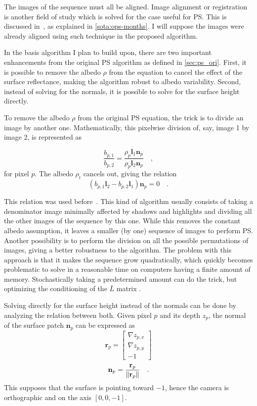The images of the sequence must all be aligned. Image alignment or registration is another field of study which is solved for the case useful for PS. This is discussed in~\cite{ackermann-cvpr-12}, as explained in \ref{sota:ops-months}. I will suppose the images were already aligned using such technique in the proposed algorithm.

In the basis algorithm I plan to build upon, there are two important enhancements from the original PS algorithm as defined in \ref{sec:ps_ori}. First, it is possible to remove the albedo $\rho$ from the equation to cancel the effect of the surface reflectance, making the algorithm robust to albedo variability. Second, instead of solving for the normals, it is possible to solve for the surface height directly. 

To remove the albedo $\rho$ from the original PS equation, the trick is to divide an image by another one. Mathematically, this pixelwise division of, say, image 1 by image 2, is represented as

\begin{equation}
\frac{b_{p,1}}{b_{p,2}} = \frac{\rho_p \mathbf{l}_1 \mathbf{n}_p}{\rho_p \mathbf{l}_2 \mathbf{n}_p} \quad,
\end{equation}
for pixel $p$. The albedo $\rho_t$ cancels out, giving the relation
\begin{equation}
\label{eq:ratio_images}
\left( b_{p,1} \mathbf{l}_2 - b_{p,2} \mathbf{l}_1 \right) \mathbf{n}_p = 0  \quad.
\end{equation}

This relation was used before~\cite{yu-iccp-13,wu-pami-06}. This kind of algorithm usually consists of taking a denominator image minimally affected by shadows and highlights and dividing all the other images of the sequence by this one. While this removes the constant albedo assumption, it leaves a smaller (by one) sequence of images to perform PS. Another possibility is to perform the division on all the possible permutations of images, giving a better robustness to the algorithm. The problem with this approach is that it makes the sequence grow quadratically, which quickly becomes problematic to solve in a reasonable time on computers having a finite amount of memory. Stochastically taking a predetermined amount can do the trick, but optimizing the conditioning of the $\bar{L}$ matrix .
 
Solving directly for the surface height instead of the normals can be done by analyzing the relation between both. Given pixel $p$ and its depth $z_p$, the normal of the surface patch $\mathbf{n}_p$ can be expressed as
\begin{equation}
\mathbf{r}_p = 
\begin{bmatrix}
\nabla z_{p,x} \\
\nabla z_{p,y} \\
-1
\end{bmatrix}
\end{equation}
\begin{equation}
\mathbf{n}_p =
\frac{\mathbf{r}_p}{\left\lVert\mathbf{r}_p\right\rVert} \quad.
\end{equation}
This supposes that the surface is pointing toward $-1$, hence the camera is orthographic and on the axis $[0, 0, -1]$.

